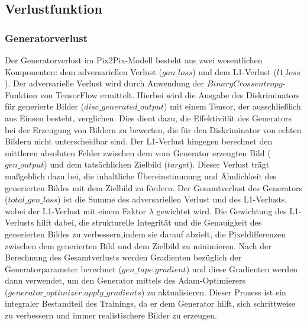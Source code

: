 \subsection{Verlustfunktion}
\subsubsection{Generatorverlust}
Der Generatorverlust im Pix2Pix-Modell besteht aus zwei wesentlichen Komponenten: dem adversariellen Verlust ($gan\_loss$) und dem L1-Verlust ($l1\_loss$). Der adversarielle Verlust wird durch Anwendung der $BinaryCrossentropy$-Funktion von TensorFlow ermittelt. Hierbei wird die Ausgabe des Diskriminators für generierte Bilder ($disc\_generated\_output$) mit einem Tensor, der ausschließlich aus Einsen besteht, verglichen. Dies dient dazu, die Effektivität des Generators bei der Erzeugung von Bildern zu bewerten, die für den Diskriminator von echten Bildern nicht unterscheidbar sind. Der L1-Verlust hingegen berechnet den mittleren absoluten Fehler zwischen dem vom Generator erzeugten Bild ($gen\_output$) und dem tatsächlichen Zielbild ($target$). Dieser Verlust trägt maßgeblich dazu bei, die inhaltliche Übereinstimmung und Ähnlichkeit des generierten Bildes mit dem Zielbild zu fördern. \newline
Der Gesamtverlust des Generators ($total\_gen\_loss$) ist die Summe des adversariellen Verlust und des L1-Verlusts, wobei der L1-Verlust mit einem Faktor $\lambda$ gewichtet wird. Die Gewichtung des L1-Verlusts hilft dabei, die strukturelle Integrität und die Genauigkeit des generierten Bildes zu verbessern,indem sie darauf abzielt, die Pixeldifferenzen zwischen dem generierten Bild und dem Zielbild zu minimieren.\newline
Nach der Berechnung des Gesamtverlusts werden Gradienten bezüglich der Generatorparameter berechnet ($gen\_tape.gradient$) und diese Gradienten werden dann verwendet, um den Generator mittels des Adam-Optimierers \\($generator\_optimizer.apply\_gradients$) zu aktualisieren. Dieser Prozess ist ein integraler Bestandteil des Trainings, da er dem Generator hilft, sich schrittweise zu verbessern und immer realistischere Bilder zu erzeugen.

